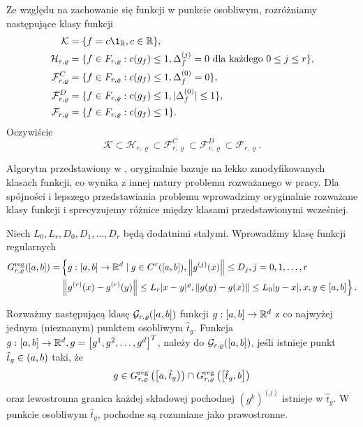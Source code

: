 \documentclass[oik, pdftex, man]{mgrwms}
\begin{document}
    Ze względu na zachowanie się funkcji w punkcie osobliwym, rozróżniamy następujące klasy funkcji
    \begin{equation*}
        \begin{split}
            \mathcal{K} & = \{f = c \1_{\R}, c \in \R \}, \\
            \mathcal{H}_{r, \varrho} & = \{ f \in F_{r, \varrho}: c(g_{f}) \leq 1, \Delta_{f}^{(j)} = 0 \text{ dla każdego } 0 \leq j \leq r\}, \\
            \mathcal{F}_{r, \varrho}^{C} & = \{ f \in F_{r, \varrho}: c(g_{f}) \leq 1, \Delta_{f}^{(0)} = 0 \}, \\
            \mathcal{F}_{r, \varrho}^{D} & = \{ f \in F_{r, \varrho}: c(g_{f}) \leq 1, | \Delta_{f}^{(0)} | \leq 1 \}, \\
            \mathcal{F}_{r, \varrho} & = \{ f \in F_{r, \varrho}: c(g_{f}) \leq 1 \}. \\
        \end{split}
    \end{equation*}
    Oczywiście
    \begin{equation*}
        \mathcal{K} \subset \mathcal{H}_{r, \varrho} \subset \mathcal{F}_{r, \varrho}^{C} \subset \mathcal{F}_{r, \varrho}^{D} \subset \mathcal{F}_{r, \varrho}.
    \end{equation*}


    Algorytm przedstawiony w  \cite{CoDF}, oryginalnie bazuje na lekko zmodyfikowanych klasach funkcji, co wynika z innej natury problemu rozważanego w pracy. Dla spójności i lepszego przedstawiania problemu wprowadzimy oryginalnie rozważane klasy funkcji i sprecyzujemy różnice między klasami przedstawionymi wcześniej.

    Niech $L_{0}, L_{r}, D_{0}, D_{1}, \ldots, D_{r}$ będą dodatnimi stałymi. Wprowadźmy klasę funkcji regularnych
    \begin{equation*}
        \begin{aligned}
        G_{r, \varrho}^{\mathrm{reg}}([a, b])= &\left\{g:[a, b] \rightarrow \mathbb{R}^{d} \mid g \in C^{r}([a, b]),\left\|g^{(j)}(x)\right\| \leq D_{j}, j=0,1, \ldots, r\right. \\
                                      &\left.\left\|g^{(r)}(x)-g^{(r)}(y)\right\| \leq L_{r}|x-y|^{\varrho},\|g(y)-g(x)\| \leq L_{0}|y-x|, x,y \in [a, b]\right\}.
        \end{aligned}
    \end{equation*}

    Rozważmy następującą klasę $\mathcal{G}_{r,\varrho}([a, b])$ funkcji $g:[a, b] \rightarrow \mathbb{R}^{d}$ z co najwyżej jednym (nieznanym) punktem osobliwym $\hat{t}_{g}$. Funkcja $g:[a, b] \rightarrow \mathbb{R}^{d}, g=\left[g^{1}, g^{2}, \ldots, g^{d}\right]^{T}$, należy do $\mathcal{G}_{r,\varrho}([a, b])$, jeśli istnieje punkt $\hat{t}_{g} \in (a, b)$ taki, że 
    \begin{equation*}
        g \in G_{r, \varrho}^{\mathrm{reg}}\left(\left[a, \hat{t}_{g}\right)\right) \cap G_{r, \varrho}^{\mathrm{reg}}\left(\left[\hat{t}_{g}, b\right]\right)    
    \end{equation*}
    oraz lewostronna granica każdej składowej pochodnej $\left(g^{k}\right)^{(j)}$ istnieje w $\hat{t}_{g}$. W punkcie osobliwym $\hat{t}_{g}$, pochodne są rozumiane jako prawostronne.
    
\end{document}
